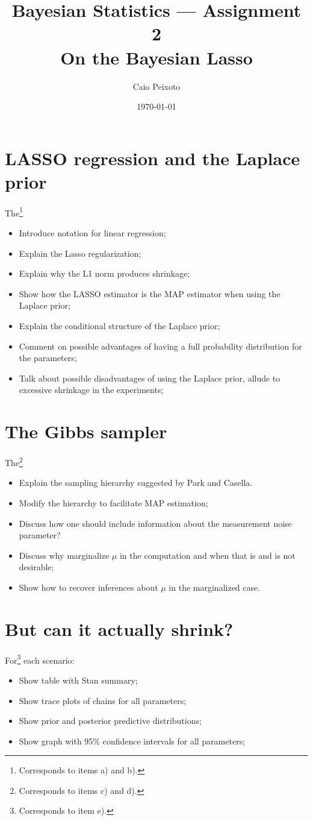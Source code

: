 \documentclass[a4paper, 12pt]{article}
\title{{\Large\bfseries\sffamily Bayesian Statistics --- Assignment 2} \\ \large\sffamily On the Bayesian Lasso}
\author{\normalsize Caio Peixoto}
\date{\normalsize\today}
\begin{document}
\maketitle

\section{LASSO regression and the Laplace prior}
The\footnote{Corresponds to items a) and b).}

\begin{itemize}
    \item Introduce notation for linear regression;
    \item Explain the Lasso regularization;
    \item Explain why the L1 norm produces shrinkage;
    \item Show how the LASSO estimator is the MAP estimator when using the Laplace prior;
    \item Explain the conditional structure of the Laplace prior;
    \item Comment on possible advantages of having a full probability distribution for the parameters;
    \item Talk about possible disadvantages of using the Laplace prior, allude to excessive shrinkage in the experiments;
\end{itemize}

\section{The Gibbs sampler}
The\footnote{Corresponds to items c) and d).}

\begin{itemize}
    \item Explain the sampling hierarchy suggested by Park and Casella.
    \item Modify the hierarchy to facilitate MAP estimation;
    \item Discuss how one should include information about the measurement noise parameter?
    \item Discuss why marginalize $\mu$ in the computation and when that is and is not desirable;
    \item Show how to recover inferences about $ \mu  $ in the marginalized case.
\end{itemize}

\section{But can it actually shrink?}
For\footnote{Corresponds to item e).}
each scenario:
\begin{itemize}
    \item Show table with Stan summary;
    \item Show trace plots of chains for all parameters;
    \item Show prior and posterior predictive distributions;
    \item Show graph with 95\% confidence intervals for all parameters;
\end{itemize}
\end{document}
